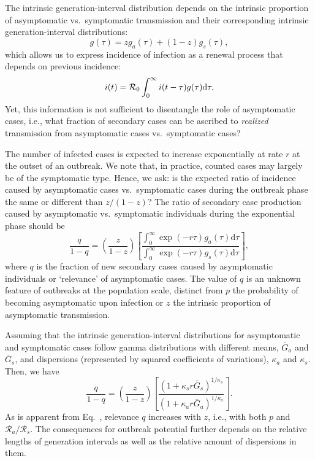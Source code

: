 The intrinsic generation-interval distribution depends on the intrinsic proportion of asymptomatic vs.~symptomatic transmission and their corresponding intrinsic generation-interval distributions:
\begin{equation}
g(\tau) = z g_a(\tau) + (1-z) g_s(\tau),
\end{equation}
which allows us to express incidence of infection as a renewal process that depends on previous incidence:
\begin{equation}
i(t) = {\cal{R}}_{0} \int_0^\infty i(t-\tau) g(\tau) \mathrm{d} \tau.
\end{equation}
Yet, this information is not sufficient to disentangle the role of asymptomatic cases, i.e., what fraction of secondary cases can be ascribed to \emph{realized} transmission from asymptomatic cases vs.~symptomatic cases?

The number of infected cases is expected to increase exponentially at rate $r$ at the outset of an outbreak. We note that, in practice, counted cases may largely be of the symptomatic type.
Hence, we ask: is the expected ratio of incidence caused by asymptomatic cases vs.~symptomatic cases during the outbreak phase the same or different than $z/(1-z)$?
The ratio of secondary case production caused by asymptomatic vs.~symptomatic individuals during the exponential phase should be
\begin{equation}
\frac{q}{1-q}=\left(\frac{z}{1-z}\right)\left[\frac{\int_0^\infty \exp(-r\tau) g_a(\tau) \mathrm{d}\tau}{\int_0^\infty \exp(-r\tau) g_s(\tau) \mathrm{d}\tau}\right],
\label{eq.qratio}
\end{equation}
where $q$ is the fraction of new secondary cases caused by asymptomatic individuals or `relevance' of asymptomatic cases. 
The value of $q$ is an unknown feature of outbreaks at the population scale, distinct from $p$ the probability of becoming asymptomatic upon infection or $z$ the intrinsic proportion of asymptomatic transmission.

Assuming that the intrinsic generation-interval distributions for asymptomatic and symptomatic cases follow gamma distributions with different means, $\bar G_a$ and  $\bar G_s$, and dispersions (represented by squared coefficients of variations), $\kappa_a$ and $\kappa_s$. 
Then, we have
\begin{equation}
\frac{q}{1-q}=\left(\frac{z}{1-z}\right)\left[\frac{(1 + \kappa_s r \bar G_s)^{1/\kappa_s}}{(1 + \kappa_a r \bar G_a)^{1/\kappa_a}}\right].
\label{eq.gammaratio}
\end{equation}
As is apparent from Eq.~, relevance $q$ increases with $z$, i.e., with both $p$ and $\mathcal R_a/\mathcal R_s$. The consequences for outbreak potential further depends on the relative lengths of generation intervals as well as the relative amount of dispersions in them.

